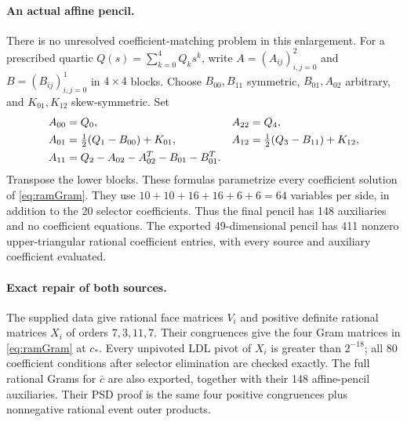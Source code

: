 \documentclass[10pt]{article}
\begin{document}
\paragraph{An actual affine pencil.}
There is no unresolved coefficient-matching problem in this enlargement.
For a prescribed quartic $Q(s)=\sum_{k=0}^4Q_ks^k$, write
$A=(A_{ij})_{i,j=0}^2$ and $B=(B_{ij})_{i,j=0}^1$ in $4\times4$ blocks.
Choose $B_{00},B_{11}$ symmetric, $B_{01},A_{02}$ arbitrary, and
$K_{01},K_{12}$ skew-symmetric. Set
\begin{align}
A_{00}&=Q_0,& A_{22}&=Q_4,\notag\\
A_{01}&=\tfrac12(Q_1-B_{00})+K_{01},&
A_{12}&=\tfrac12(Q_3-B_{11})+K_{12},\notag\\
A_{11}&=Q_2-A_{02}-A_{02}^T-B_{01}-B_{01}^T.               \label{eq:param}
\end{align}
Transpose the lower blocks. These formulas parametrize every coefficient
solution of \eqref{eq:ramGram}. They use $10+10+16+16+6+6=64$ variables
per side, in addition to the 20 selector coefficients. Thus the final
pencil has 148 auxiliaries and no coefficient equations. The exported
49-dimensional pencil has 411 nonzero upper-triangular rational coefficient
entries, with every source and auxiliary coefficient evaluated.

\paragraph{Exact repair of both sources.}
The supplied data give rational face matrices $V_i$ and positive definite
rational matrices $X_i$ of orders $7,3,11,7$. Their congruences give the
four Gram matrices in \eqref{eq:ramGram} at $c_*$. Every unpivoted LDL
pivot of $X_i$ is greater than $2^{-18}$; all 80 coefficient conditions
after selector elimination are checked exactly. The full rational Grams for
$\bar c$ are also exported, together with their 148 affine-pencil
auxiliaries. Their PSD proof is the same four positive congruences plus
nonnegative rational event outer products.
\end{document}
